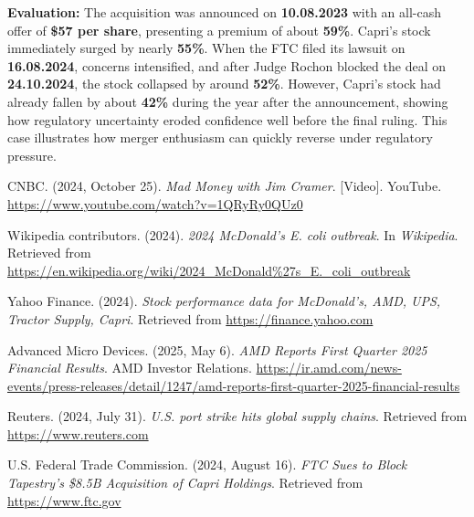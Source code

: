 \documentclass[12pt,a4paper]{article}
\begin{document}
\begin{itemize}
\textbf{Evaluation:} The acquisition was announced on \textbf{10.08.2023} with an all-cash 
offer of \textbf{\$57 per share}, presenting a premium of about \textbf{59\%}. 
Capri’s stock immediately surged by nearly \textbf{55\%}. 
When the FTC filed its lawsuit on \textbf{16.08.2024}, concerns intensified, 
and after Judge Rochon blocked the deal on \textbf{24.10.2024}, 
the stock collapsed by around \textbf{52\%}. 
However, Capri’s stock had already fallen by about \textbf{42\%} during the year after the announcement, 
showing how regulatory uncertainty eroded confidence well before the final ruling. 
This case illustrates how merger enthusiasm can quickly reverse under regulatory pressure.
\end{itemize}

\begin{thebibliography}{9}

 CNBC. (2024, October 25). \textit{Mad Money with Jim Cramer}. [Video]. YouTube.  
\url{https://www.youtube.com/watch?v=1QRyRy0QUz0}

 Wikipedia contributors. (2024). \textit{2024 McDonald’s E. coli outbreak}. In \textit{Wikipedia}.  
Retrieved from \url{https://en.wikipedia.org/wiki/2024_McDonald%27s_E._coli_outbreak}

 Yahoo Finance. (2024). \textit{Stock performance data for McDonald’s, AMD, UPS, Tractor Supply, Capri}.  
Retrieved from \url{https://finance.yahoo.com}

Advanced Micro Devices. (2025, May 6).
\textit{AMD Reports First Quarter 2025 Financial Results}.
AMD Investor Relations.
\url{https://ir.amd.com/news-events/press-releases/detail/1247/amd-reports-first-quarter-2025-financial-results}

 Reuters. (2024, July 31). \textit{U.S. port strike hits global supply chains}.  
Retrieved from \url{https://www.reuters.com}

 U.S. Federal Trade Commission. (2024, August 16). \textit{FTC Sues to Block Tapestry’s \$8.5B Acquisition of Capri Holdings}.  
Retrieved from \url{https://www.ftc.gov}

\end{thebibliography}
\end{document}
